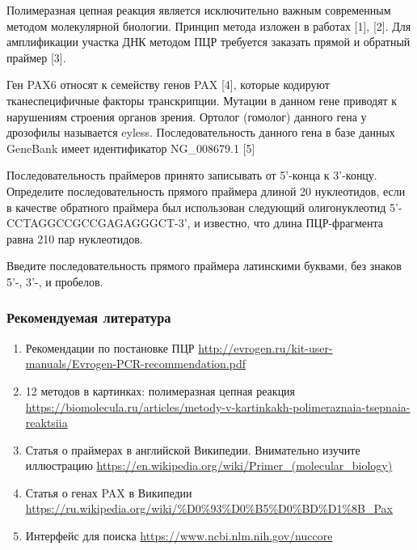 
Полимеразная цепная реакция является исключительно важным современным методом молекулярной биологии. 
Принцип метода изложен в работах [1], [2]. Для амплификации участка ДНК методом ПЦР требуется заказать 
прямой и обратный праймер [3].

Ген PAX6 относят к семейству генов PAX [4], которые кодируют тканеспецифичные факторы транскрипции. 
Мутации в данном гене приводят к нарушениям строения органов зрения. Ортолог (гомолог) данного гена 
у дрозофилы называется eyless. Последовательность данного гена в базе данных GeneBank имеет идентификатор
 NG\_008679.1 [5]

Последовательность праймеров принято записывать от 5'-конца к 3'-концу. Определите последовательность прямого праймера длиной 20 нуклеотидов, если в качестве обратного праймера был использован следующий \linebreak олигонуклеотид 5'- CCTAGGCCGCCGAGAGGGCT-3', и известно, что длина ПЦР-фрагмента равна 210 пар нуклеотидов.

Введите последовательность прямого праймера латинскими буквами, без знаков 5'-, 3'-, и пробелов.

\subsubsection*{Рекомендуемая литература}

\begin{enumerate}
    \item Рекомендации по постановке ПЦР \url{http://evrogen.ru/kit-user-manuals/Evrogen-PCR-recommendation.pdf}
    \item 12 методов в картинках: полимеразная цепная реакция \url{https://biomolecula.ru/articles/metody-v-kartinkakh-polimeraznaia-tsepnaia-reaktsiia}
    \item Статья о праймерах в английской Википедии. Внимательно изучите иллюстрацию \url{https://en.wikipedia.org/wiki/Primer_(molecular_biology)}
    \item Статья о генах PAX в Википедии \url{https://ru.wikipedia.org/wiki/%D0%93%D0%B5%D0%BD%D1%8B_Pax}
    \item Интерфейс для поиска \url{https://www.ncbi.nlm.nih.gov/nuccore}
\end{enumerate}